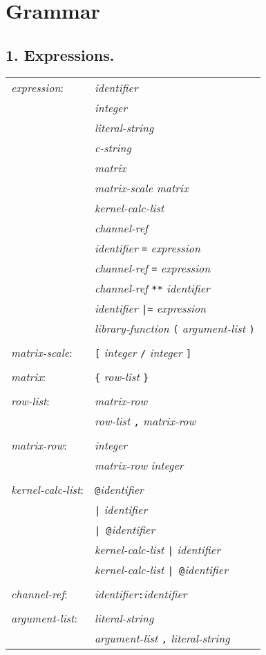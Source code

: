 \section{Grammar}

\subsection{1. Expressions.}

\begin{center}\begin{tabular}{l l}
\emph{expression}: & \emph{identifier}\\
& \emph{integer}\\
& \emph{literal-string}\\
& \emph{c-string}\\
& \emph{matrix}\\
& \emph{matrix-scale matrix}\\
& \emph{kernel-calc-list}\\
& \emph{channel-ref}\\
& \emph{identifier} \texttt{=} \emph{expression}\\
& \emph{channel-ref} \texttt{=} \emph{expression}\\
& \emph{channel-ref} \texttt{**} \emph{identifier}\\
& \emph{identifier} \texttt{|=} \emph{expression}\\
& \emph{library-function} \texttt{(} \emph{argument-list} \texttt{)}\\
\\
\emph{matrix-scale}: & \texttt{[} \emph{integer} \texttt{/} \emph{integer} \texttt{]}\\
\\
\emph{matrix}: & \texttt{\{} \emph{row-list} \texttt{\}}\\
\\
\emph{row-list}: & \emph{matrix-row}\\
& \emph{row-list} \texttt{,} \emph{matrix-row}\\
\\
\emph{matrix-row}: & \emph{integer}\\
& \emph{matrix-row} \emph{integer}\\
\\
\emph{kernel-calc-list}: & \texttt{@}\emph{identifier}\\
& \texttt{|} \emph{identifier}\\
& \texttt{| @}\emph{identifier}\\
& \emph{kernel-calc-list} \texttt{|} \emph{identifier}\\
& \emph{kernel-calc-list} \texttt{| @}\emph{identifier}\\
\\
\emph{channel-ref}: & \emph{identifier}\texttt{:}\emph{identifier}\\
\\
\emph{argument-list}: & \emph{literal-string}\\
& \emph{argument-list} \texttt{,} \emph{literal-string}\\
\end{tabular}\end{center}
